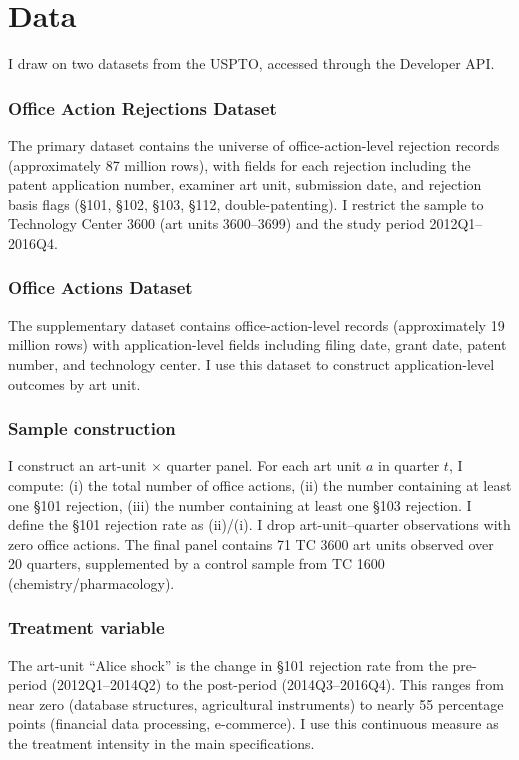 \documentclass[12pt]{article}
\begin{document}
\section{Data}

I draw on two datasets from the USPTO, accessed through the Developer API.

\subsubsection*{Office Action Rejections Dataset} The primary dataset contains the universe of office-action-level rejection records (approximately 87 million rows), with fields for each rejection including the patent application number, examiner art unit, submission date, and rejection basis flags (\S101, \S102, \S103, \S112, double-patenting). I restrict the sample to Technology Center 3600 (art units 3600--3699) and the study period 2012Q1--2016Q4.

\subsubsection*{Office Actions Dataset} The supplementary dataset contains office-action-level records (approximately 19 million rows) with application-level fields including filing date, grant date, patent number, and technology center. I use this dataset to construct application-level outcomes by art unit.

\subsubsection*{Sample construction} I construct an art-unit $\times$ quarter panel. For each art unit $a$ in quarter $t$, I compute: (i) the total number of office actions, (ii) the number containing at least one \S101 rejection, (iii) the number containing at least one \S103 rejection. I define the \S101 rejection rate as (ii)/(i). I drop art-unit--quarter observations with zero office actions. The final panel contains 71 TC 3600 art units observed over 20 quarters, supplemented by a control sample from TC 1600 (chemistry/pharmacology).

\subsubsection*{Treatment variable} The art-unit ``Alice shock'' is the change in \S101 rejection rate from the pre-period (2012Q1--2014Q2) to the post-period (2014Q3--2016Q4). This ranges from near zero (database structures, agricultural instruments) to nearly 55 percentage points (financial data processing, e-commerce). I use this continuous measure as the treatment intensity in the main specifications.
\end{document}
